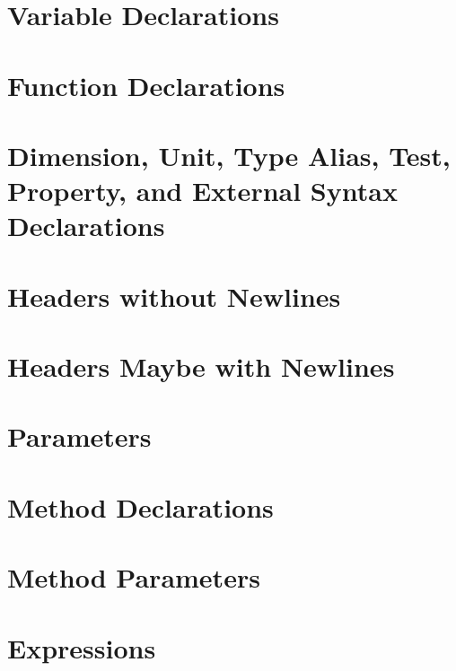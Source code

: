 \section{Variable Declarations}


\section{Function Declarations}


\section{Dimension, Unit, Type Alias, Test, Property, and External Syntax
  Declarations}


\section{Headers without Newlines}


\section{Headers Maybe with Newlines}


\section{Parameters}


\section{Method Declarations}


\section{Method Parameters}


\section{Expressions}


